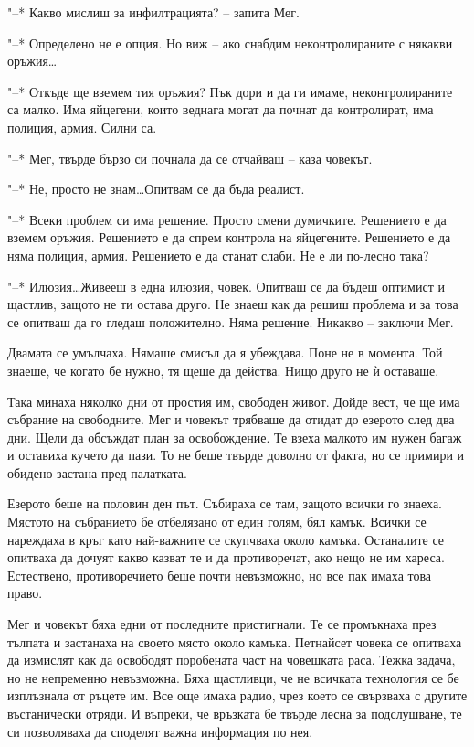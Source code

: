 \documentclass[ebook,openany,12pt]{memoir}
\begin{document}
"--* Какво мислиш за инфилтрацията? – запита Мег.

"--* Определено не е опция. Но виж – ако снабдим неконтролираните с някакви оръжия\ldots

"--* Откъде ще вземем тия оръжия? Пък дори и да ги имаме, неконтролираните са малко. Има яйцегени, които веднага могат да почнат да контролират, има полиция, армия. Силни са.

"--* Мег, твърде бързо си почнала да се отчайваш – каза човекът.

"--* Не, просто не знам\ldots Опитвам се да бъда реалист.

"--* Всеки проблем си има решение. Просто смени думичките. Решението е да вземем оръжия. Решението е да спрем контрола на яйцегените. Решението е да няма полиция, армия. Решението е да станат слаби. Не е ли по-лесно така?

"--* Илюзия\ldots Живееш в една илюзия, човек. Опитваш се да бъдеш оптимист и щастлив, защото не ти остава друго. Не знаеш как да решиш проблема и за това се опитваш да го гледаш положително. Няма решение. Никакво – заключи Мег.

Двамата се умълчаха. Нямаше смисъл да я убеждава. Поне не в момента. Той знаеше, че когато бе нужно, тя щеше да действа. Нищо друго не ѝ оставаше.

Така минаха няколко дни от простия им, свободен живот. Дойде вест, че ще има събрание на свободните. Мег и човекът трябваше да отидат до езерото след два дни. Щели да обсъждат план за освобождение. Те взеха малкото им нужен багаж и оставиха кучето да пази. То не беше твърде доволно от факта, но се примири и обидено застана пред палатката.

Езерото беше на половин ден път. Събираха се там, защото всички го знаеха. Мястото на събранието бе отбелязано от един голям, бял камък. Всички се нареждаха в кръг като най-важните се скупчваха около камъка. Останалите се опитваха да дочуят какво казват те и да противоречат, ако нещо не им хареса. Естествено, противоречието беше почти невъзможно, но все пак имаха това право.

Мег и човекът бяха едни от последните пристигнали. Те се промъкнаха през тълпата и застанаха на своето място около камъка. Петнайсет човека се опитваха да измислят как да освободят поробената част на човешката раса. Тежка задача, но не непременно невъзможна. Бяха щастливци, че не всичката технология се бе изплъзнала от ръцете им. Все още имаха радио, чрез което се свързваха с другите въстанически отряди. И въпреки, че връзката бе твърде лесна за подслушване, те си позволяваха да споделят важна информация по нея.
\end{document}
